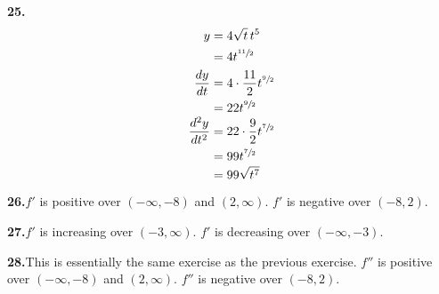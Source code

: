 \documentclass[10pt,oneside,]{book}
\theoremstyle{plain}
\theoremstyle{definition}
\numberwithin{equation}{section}
\newcommand{\ointerval}[2]{\left(#1,#2\right)}
\newcommand{\fd}[1]{#1'}
\newcommand{\sd}[1]{#1''}
\newcommand{\lz}[2]{\frac{d#1}{d#2}}
\newcommand{\lzn}[3]{\frac{d^{#1}#2}{d#3^{#1}}}
\begin{document}
\par\smallskip
\noindent\textbf{25.}\quad{}\begin{align*}
y&=4\sqrt{t}\,t^5\\
&=4t^{\sfrac{11}{2}}\\
\lz{y}{t}&=4\cdot\frac{11}{2}t^{\sfrac{9}{2}}\\
&=22t^{\sfrac{9}{2}}\\
\lzn{2}{y}{t}&=22\cdot\frac{9}{2}t^{\sfrac{7}{2}}\\
&=99t^{\sfrac{7}{2}}\\
&=99\sqrt{t^7}
\end{align*}%
\par\smallskip
\noindent\textbf{26.}\quad{}\(\fd{f}\) is positive over \(\ointerval{-\infty}{-8}\) and \(\ointerval{2}{\infty}\). \(\fd{f}\) is negative over \(\ointerval{-8}{2}\).%
\par\smallskip
\noindent\textbf{27.}\quad{}\(\fd{f}\) is increasing over \(\ointerval{-3}{\infty}\). \(\fd{f}\) is decreasing over \(\ointerval{-\infty}{-3}\).%
\par\smallskip
\noindent\textbf{28.}\quad{}This is essentially the same exercise as the previous exercise. \(\sd{f}\) is positive over \(\ointerval{-\infty}{-8}\) and \(\ointerval{2}{\infty}\). \(\sd{f}\) is negative over \(\ointerval{-8}{2}\).%
\par\smallskip
\end{document}
